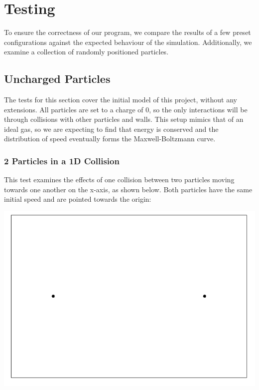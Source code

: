 \documentclass{article}
\begin{document}
\section{Testing}
To ensure the correctness of our program,
we compare the results of a few preset configurations against the expected behaviour of the simulation.
Additionally, we examine a collection of randomly positioned particles.

\subsection{Uncharged Particles}
The tests for this section cover the initial model of this project, without any extensions.
All particles are set to a charge of 0, so the only interactions will be through collisions with other particles and walls.
This setup mimics that of an ideal gas, so we are expecting to find that energy is conserved and
the distribution of speed eventually forms the Maxwell-Boltzmann curve.

\subsubsection{2 Particles in a 1D Collision}
This test examines the effects of one collision between two particles moving towards one another on the x-axis,
as shown below. Both particles have the same initial speed and are pointed towards the origin:
\\
\begin{center}
\includegraphics[scale=0.5]{uncharged_2_particles_1D}
\end{center}
\end{document}
